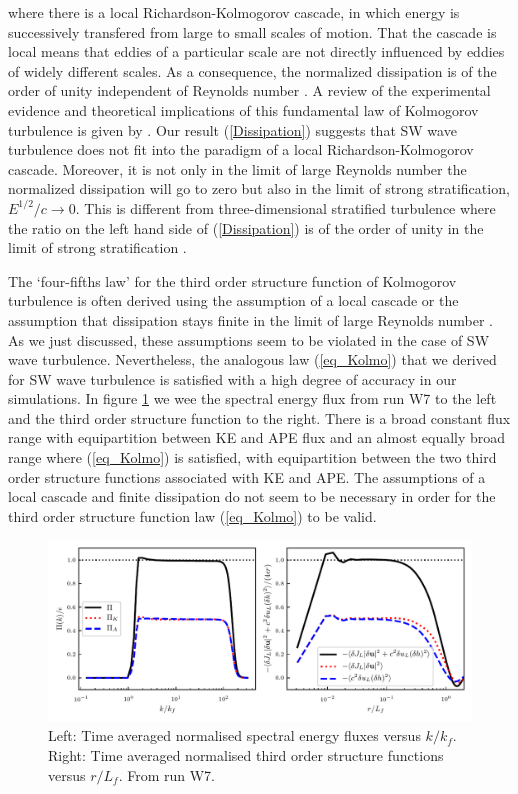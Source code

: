 where there is a local Richardson-Kolmogorov cascade, in which energy is successively transfered from large to small scales of motion.  That the cascade is local means that eddies of a particular scale are not directly influenced by eddies of widely different scales. As a consequence, the normalized dissipation is of the order of unity independent of Reynolds number \cite[]{Pope, TennekesLumley}. A review of the experimental evidence and theoretical implications of this fundamental law of Kolmogorov turbulence is given by \cite{Vassilicos2015}. 
Our result (\ref{Dissipation})  suggests that SW wave turbulence does not fit into the paradigm of a local Richardson-Kolmogorov cascade. Moreover, it is not only in the limit of large Reynolds number the normalized dissipation will go to zero but also in the limit of strong stratification, $ E^{1/2}/c \rightarrow 0 $. This is  different from three-dimensional stratified turbulence where the ratio on the left hand side of (\ref{Dissipation}) is of the order of unity in the limit of strong stratification  \cite[]{Lindborg2006, Brethouwer2007}.


 The `four-fifths law' for the third order structure function of Kolmogorov turbulence is often derived using the assumption of a local cascade \cite[]{Vassilicos2015} or the assumption that dissipation stays finite in the limit of large Reynolds number \cite[]{Frisch}. As we just discussed, these assumptions seem to be violated in the case of SW wave turbulence. Nevertheless, the analogous law (\ref{eq_Kolmo}) that we derived for SW wave turbulence is satisfied with a high degree of accuracy in our simulations. In figure \ref{Flux} we wee the spectral energy flux from run W7 to the left and the third order structure function to the right. There is a broad constant flux range  with equipartition between KE and APE flux and an almost equally broad range where (\ref{eq_Kolmo}) is satisfied, with equipartition between the two third order structure functions associated with KE and APE. The assumptions of a local cascade and finite dissipation do not seem to be necessary in order for the third order structure function law  (\ref{eq_Kolmo}) to be valid.



\begin{figure}
\centerline{\includegraphics[width=5.8in]{../Pyfig/fig_flux_struct_combined}}
\caption{Left: Time averaged normalised spectral energy fluxes versus $ k/k_f $. Right: Time averaged normalised third order structure functions versus $ r/L_f $. From run W7. }
\label{Flux}
\end{figure}


